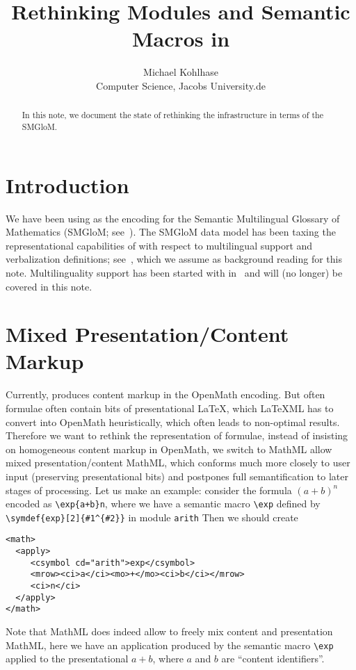 \documentclass{bluenote}
\title{Rethinking Modules and Semantic Macros in \protect\sTeX}
\author{Michael Kohlhase\\Computer Science, Jacobs University.de}
\def\smglom{\textsf{SMGloM}\xspace}
\def\latexml{{\LaTeX}ML\xspace}
\begin{document}
\maketitle
\begin{abstract}
  In this note, we document the state of rethinking the \sTeX infrastructure in terms of
  the \smglom.
\end{abstract}

\section{Introduction}
We have been using \sTeX as the encoding for the Semantic Multilingual Glossary of
Mathematics (\smglom; see~\cite{IanJucKoh:sps14}). The \smglom data model has been taxing
the representational capabilities of \sTeX with respect to multilingual support and
verbalization definitions; see~\cite{Kohlhase:dmesmgm14}, which we assume as background
reading for this note. Multilinguality support has been started with
in~\cite{KohGin:smss:svn} and will (no longer) be covered in this note.

\section{Mixed Presentation/Content Markup}
Currently, \sTeX produces content markup in the OpenMath encoding. But often \sTeX
formulae often contain bits of presentational {\LaTeX}, which \latexml has to convert into
OpenMath heuristically, which often leads to non-optimal results. Therefore we want to
rethink the representation of formulae, instead of insisting on homogeneous content markup
in OpenMath, we switch to MathML allow mixed presentation/content MathML, which conforms
much more closely to user input (preserving presentational bits) and postpones full
semantification to later stages of processing. Let us make an example: consider the
formula $(a+b)^n$ encoded as \lstinline|\exp{a+b}n|, where we have a semantic macro
\lstinline|\exp| defined by \lstinline|\symdef{exp}[2]{#1^{#2}}| in module
\lstinline|arith| Then we should create
\begin{lstlisting}[language=MathML]
<math>
  <apply>
     <csymbol cd="arith">exp</csymbol>
     <mrow><ci>a</ci><mo>+</mo><ci>b</ci></mrow>
     <ci>n</ci>
  </apply>
</math>
\end{lstlisting}
Note that MathML does indeed allow to freely mix content and presentation MathML, here we
have an application produced by the semantic macro \lstinline|\exp| applied to the
presentational $a+b$, where $a$ and $b$ are ``content identifiers''. 
\end{document}
